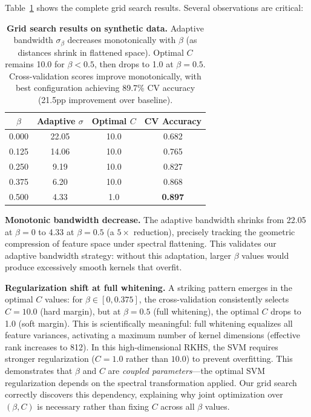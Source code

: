 \documentclass[11pt]{article}
\begin{document}
Table~\ref{tab:synthetic_grid_search} shows the complete grid search results. Several observations are critical:

\begin{table}[h]
\centering
\caption{\textbf{Grid search results on synthetic data.} Adaptive bandwidth $\sigma_\beta$ decreases monotonically with $\beta$ (as distances shrink in flattened space). Optimal $C$ remains 10.0 for $\beta < 0.5$, then drops to 1.0 at $\beta=0.5$. Cross-validation scores improve monotonically, with best configuration achieving 89.7\% CV accuracy (21.5pp improvement over baseline).}
\label{tab:synthetic_grid_search}
\begin{tabular}{cccc}
\toprule
$\beta$ & Adaptive $\sigma$ & Optimal $C$ & CV Accuracy \\
\midrule
0.000 & 22.05 & 10.0 & 0.682 \\
0.125 & 14.06 & 10.0 & 0.765 \\
0.250 & 9.19  & 10.0 & 0.827 \\
0.375 & 6.20  & 10.0 & 0.868 \\
0.500 & 4.33  & 1.0  & \textbf{0.897} \\
\bottomrule
\end{tabular}
\end{table}

\textbf{Monotonic bandwidth decrease.} The adaptive bandwidth shrinks from 22.05 at $\beta=0$ to 4.33 at $\beta=0.5$ (a $5\times$ reduction), precisely tracking the geometric compression of feature space under spectral flattening. This validates our adaptive bandwidth strategy: without this adaptation, larger $\beta$ values would produce excessively smooth kernels that overfit.

\textbf{Regularization shift at full whitening.} A striking pattern emerges in the optimal $C$ values: for $\beta \in [0, 0.375]$, the cross-validation consistently selects $C=10.0$ (hard margin), but at $\beta=0.5$ (full whitening), the optimal $C$ drops to 1.0 (soft margin). This is scientifically meaningful: full whitening equalizes all feature variances, activating a maximum number of kernel dimensions (effective rank increases to 812). In this high-dimensional RKHS, the SVM requires stronger regularization ($C=1.0$ rather than $10.0$) to prevent overfitting. This demonstrates that $\beta$ and $C$ are \emph{coupled parameters}---the optimal SVM regularization depends on the spectral transformation applied. Our grid search correctly discovers this dependency, explaining why joint optimization over $(\beta, C)$ is necessary rather than fixing $C$ across all $\beta$ values.
\end{document}
